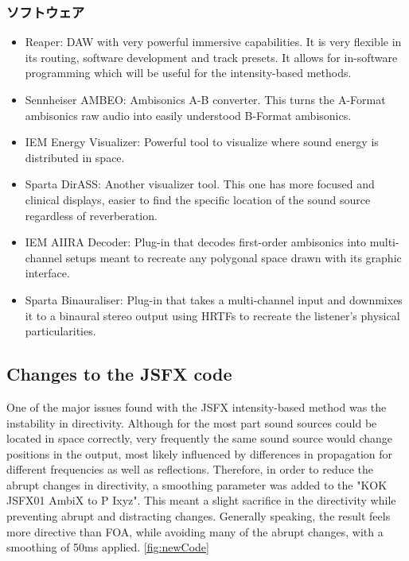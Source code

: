 \documentclass[a4paper, 12pt]{article}
\begin{document}
\subsubsection{ソフトウェア}
\begin{itemize}
    \item Reaper: DAW with very powerful immersive capabilities. It is very flexible in its routing, software development and track presets. It allows for in-software programming which will be useful for the intensity-based methods.
    \item Sennheiser AMBEO: Ambisonics A-B converter. This turns the A-Format ambisonics raw audio into easily understood B-Format ambisonics.
    \item IEM Energy Visualizer: Powerful tool to visualize where sound energy is distributed in space.
    \item Sparta DirASS: Another visualizer tool. This one has more focused and clinical displays, easier to find the specific location of the sound source regardless of reverberation.
    \item IEM AIIRA Decoder: Plug-in that decodes first-order ambisonics into multi-channel setups meant to recreate any polygonal space drawn with its graphic interface.
    \item Sparta Binauraliser: Plug-in that takes a multi-channel input and downmixes it to a binaural stereo output using HRTFs to recreate the listener's physical particularities.
\end{itemize}

\subsection{Changes to the JSFX code}

One of the major issues found with the JSFX intensity-based method was the instability in directivity. Although for the most part sound sources could be located in space correctly, very frequently the same sound source would change positions in the output, most likely influenced by differences in propagation for different frequencies as well as reflections. Therefore, in order to reduce the abrupt changes in directivity, a smoothing parameter was added to the "KOK JSFX01 AmbiX to P Ixyz". This meant a slight sacrifice in the directivity while preventing abrupt and distracting changes. Generally speaking, the result feels more directive than FOA, while avoiding many of the abrupt changes, with a smoothing of 50ms applied. \ref{fig:newCode}
\end{document}
